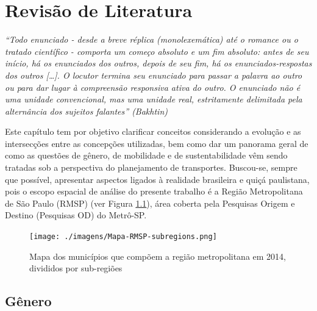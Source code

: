 \chapter{Revisão de Literatura}\label{chap:revisao-literatura}
\begin{citacao}
	\begin{flushright}  
\emph{``Todo enunciado - desde a breve réplica (monolexemática) até o romance ou o tratado científico - comporta um começo absoluto e um fim absoluto: antes de seu início, há os enunciados dos outros, depois de seu fim, há os enunciados-respostas dos outros [\ldots]. O locutor termina seu enunciado para passar a palavra ao outro ou para dar lugar à compreensão responsiva ativa do outro. O enunciado não é uma unidade convencional, mas uma unidade real, estritamente delimitada pela alternância dos sujeitos falantes'' (Bakhtin)}
	\end{flushright}
\end{citacao}

Este capítulo tem por objetivo clarificar conceitos considerando a evolução e as intersecções entre as concepções utilizadas, bem como dar um panorama geral de como as questões de gênero, de mobilidade e de sustentabilidade vêm sendo tratadas sob a perspectiva do planejamento de transportes. 
Buscou-se, sempre que possível, apresentar aspectos ligados à realidade brasileira e quiçá paulistana, pois o escopo espacial de análise do presente trabalho é a Região Metropolitana de São Paulo (RMSP) (ver Figura \ref{fig:mapa-rmsp}), área coberta pela Pesquisas Origem e Destino (Pesquisas OD) do Metrô-SP. 

\begin{figure}[htb]%
    \caption{\label{fig:mapa-rmsp}Mapa dos municípios que compõem a região metropolitana em 2014, divididos por sub-regiões}%
    \begin{center}%
        \texttt{[image: ./imagens/Mapa-RMSP-subregions.png]}%
    \end{center}%
\end{figure}%

\section{Gênero}

